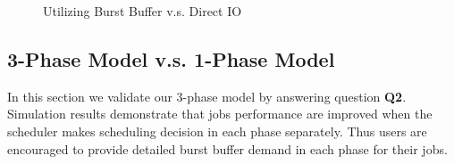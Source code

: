 \begin{figure}[!t]
        \centering
        \caption{Utilizing Burst Buffer v.s. Direct IO}
        \label{Fig:DirectIOPerformance}
\end{figure}



\subsection{3-Phase Model v.s. 1-Phase Model}
In this section we validate our 3-phase model by answering question \textbf{Q2}.
Simulation results demonstrate that jobs performance are improved 
when the scheduler makes scheduling decision in each phase separately.
Thus users are encouraged to provide detailed burst buffer demand in each phase for their jobs.

